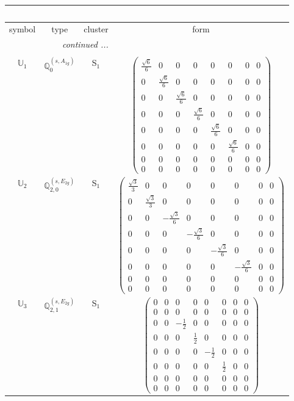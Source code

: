 \documentclass[fleqn,10pt,landscape]{article}
\begin{document}
\begin{itemize}
\begin{center}
\begin{longtable}{c|c|c|c}
\multicolumn{3}{l}{\tablename\ \thetable{}} \\
 \hline \hline
symbol & type & cluster & form \\ \hline \endhead

 \hline \hline
\multicolumn{3}{r}{\footnotesize\it continued ...} \\ \endfoot

 \hline \hline
\multicolumn{3}{r}{} \\ \endlastfoot

$ \mathbb{U}_{1} $ & $\mathbb{Q}_{0}^{(s,A_{1g})}$ & S$_{1}$ & $\begin{pmatrix} \frac{\sqrt{6}}{6} & 0 & 0 & 0 & 0 & 0 & 0 & 0 \\ 0 & \frac{\sqrt{6}}{6} & 0 & 0 & 0 & 0 & 0 & 0 \\ 0 & 0 & \frac{\sqrt{6}}{6} & 0 & 0 & 0 & 0 & 0 \\ 0 & 0 & 0 & \frac{\sqrt{6}}{6} & 0 & 0 & 0 & 0 \\ 0 & 0 & 0 & 0 & \frac{\sqrt{6}}{6} & 0 & 0 & 0 \\ 0 & 0 & 0 & 0 & 0 & \frac{\sqrt{6}}{6} & 0 & 0 \\ 0 & 0 & 0 & 0 & 0 & 0 & 0 & 0 \\ 0 & 0 & 0 & 0 & 0 & 0 & 0 & 0 \end{pmatrix}$ \\
$ \mathbb{U}_{2} $ & $\mathbb{Q}_{2,0}^{(s,E_{2g})}$ & S$_{1}$ & $\begin{pmatrix} \frac{\sqrt{3}}{3} & 0 & 0 & 0 & 0 & 0 & 0 & 0 \\ 0 & \frac{\sqrt{3}}{3} & 0 & 0 & 0 & 0 & 0 & 0 \\ 0 & 0 & - \frac{\sqrt{3}}{6} & 0 & 0 & 0 & 0 & 0 \\ 0 & 0 & 0 & - \frac{\sqrt{3}}{6} & 0 & 0 & 0 & 0 \\ 0 & 0 & 0 & 0 & - \frac{\sqrt{3}}{6} & 0 & 0 & 0 \\ 0 & 0 & 0 & 0 & 0 & - \frac{\sqrt{3}}{6} & 0 & 0 \\ 0 & 0 & 0 & 0 & 0 & 0 & 0 & 0 \\ 0 & 0 & 0 & 0 & 0 & 0 & 0 & 0 \end{pmatrix}$ \\
$ \mathbb{U}_{3} $ & $\mathbb{Q}_{2,1}^{(s,E_{2g})}$ & S$_{1}$ & $\begin{pmatrix} 0 & 0 & 0 & 0 & 0 & 0 & 0 & 0 \\ 0 & 0 & 0 & 0 & 0 & 0 & 0 & 0 \\ 0 & 0 & - \frac{1}{2} & 0 & 0 & 0 & 0 & 0 \\ 0 & 0 & 0 & \frac{1}{2} & 0 & 0 & 0 & 0 \\ 0 & 0 & 0 & 0 & - \frac{1}{2} & 0 & 0 & 0 \\ 0 & 0 & 0 & 0 & 0 & \frac{1}{2} & 0 & 0 \\ 0 & 0 & 0 & 0 & 0 & 0 & 0 & 0 \\ 0 & 0 & 0 & 0 & 0 & 0 & 0 & 0 \end{pmatrix}$ \\ \hline

\end{longtable}
\end{center}
\end{itemize}
\end{document}
